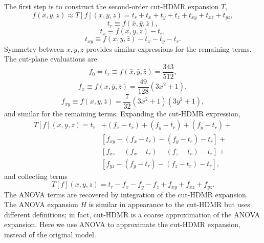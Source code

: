 The first step is to construct the second-order cut-HDMR expansion $T$,
\begin{equation}
  f(x,y,z) \approx T[f](x,y,z) = t_r + t_x + t_y + t_z + t_{xy} + t_{xz} + t_{yz},
\end{equation}
\begin{equation}
  t_r \equiv f(\bar x,\bar y,\bar z),
\end{equation}
\begin{equation}
  t_x \equiv f(x,\bar y,\bar z) -t_r,
\end{equation}
\begin{equation}
  t_{xy} \equiv f(x,y,\bar z) - t_x - t_y - t_r.
\end{equation}
Symmetry between $x,y,z$ provides similar expressions for the remaining terms.
The cut-plane evaluations are
\begin{equation}
  f_0 = t_r \equiv f(\bar x,\bar y,\bar z) = \frac{343}{512},
\end{equation}
\begin{equation}
  f_x \equiv f(x,\bar y, \bar z) = \frac{49}{128}(3x^2+1),
\end{equation}
\begin{equation}
  f_{xy} \equiv f(x,y, \bar z) = \frac{7}{32}(3x^2+1)(3y^2+1),
\end{equation}
and similar for the remaining terms.  Expanding the cut-HDMR expression,
\begin{align}
  T[f](x,y,z) = t_r &+ (f_x-t_r) + (f_y-t_r) + (f_y-t_r) +\nonumber\\
  &[f_{xy} - (f_x-t_r) - (f_y-t_r) - t_r]+ \nonumber\\
  &[f_{xz} - (f_x-t_r) - (f_z-t_r) - t_r]+ \nonumber\\
  &[f_{yz} - (f_y-t_r) - (f_z-t_r) - t_r],
\end{align}
and collecting terms
\begin{equation}
  T[f](x,y,z) = t_r - f_x - f_y - f_z + f_{xy} + f_{xz} + f_{yz}.
\end{equation}
The ANOVA terms are recovered by integration of the cut-HDMR expansion.  The ANOVA expansion $H$ is similar in
appearance to the cut-HDMR but uses different definitions; in fact, cut-HDMR is a coarse approximation of the
ANOVA expansion.  Here we use ANOVA to approximate the cut-HDMR expansion, instead of the original model.

